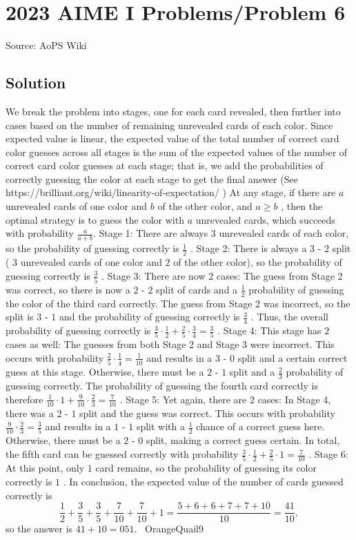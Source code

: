 \documentclass[12pt]{article}
\begin{document}
\section*{{2023 AIME I Problems/Problem 6}}
Source: AoPS Wiki

\subsection*{Solution}
We break the problem into stages, one for each card revealed, then further into cases based on the number of remaining unrevealed cards of each color. Since expected value is linear, the expected value of the total number of correct card color guesses across all stages is the sum of the expected values of the number of correct card color guesses at each stage; that is, we add the probabilities of correctly guessing the color at each stage to get the final answer (See https://brilliant.org/wiki/linearity-of-expectation/ ) At any stage, if there are $a$ unrevealed cards of one color and $b$ of the other color, and $a \geq b$ , then the optimal strategy is to guess the color with $a$ unrevealed cards, which succeeds with probability $\frac{a}{a+b}.$ Stage 1: There are always $3$ unrevealed cards of each color, so the probability of guessing correctly is $\frac{1}{2}$ . Stage 2: There is always a $3$ - $2$ split ( $3$ unrevealed cards of one color and $2$ of the other color), so the probability of guessing correctly is $\frac{3}{5}$ . Stage 3: There are now $2$ cases: The guess from Stage 2 was correct, so there is now a $2$ - $2$ split of cards and a $\frac{1}{2}$ probability of guessing the color of the third card correctly. The guess from Stage 2 was incorrect, so the split is $3$ - $1$ and the probability of guessing correctly is $\frac{3}{4}$ . Thus, the overall probability of guessing correctly is $\frac{3}{5} \cdot \frac{1}{2} + \frac{2}{5} \cdot \frac{3}{4} = \frac{3}{5}$ . Stage 4: This stage has $2$ cases as well: The guesses from both Stage 2 and Stage 3 were incorrect. This occurs with probability $\frac{2}{5} \cdot \frac{1}{4} = \frac{1}{10}$ and results in a $3$ - $0$ split and a certain correct guess at this stage. Otherwise, there must be a $2$ - $1$ split and a $\frac{2}{3}$ probability of guessing correctly. The probability of guessing the fourth card correctly is therefore $\frac{1}{10} \cdot 1 + \frac{9}{10} \cdot \frac{2}{3} = \frac{7}{10}$ . Stage 5: Yet again, there are $2$ cases: In Stage 4, there was a $2$ - $1$ split and the guess was correct. This occurs with probability $\frac{9}{10} \cdot \frac{2}{3} = \frac{3}{5}$ and results in a $1$ - $1$ split with a $\frac{1}{2}$ chance of a correct guess here. Otherwise, there must be a $2$ - $0$ split, making a correct guess certain. In total, the fifth card can be guessed correctly with probability $\frac{3}{5} \cdot \frac{1}{2} + \frac{2}{5} \cdot 1 = \frac{7}{10}$ . Stage 6: At this point, only $1$ card remains, so the probability of guessing its color correctly is $1$ . In conclusion, the expected value of the number of cards guessed correctly is \[\frac{1}{2} + \frac{3}{5} + \frac{3}{5} + \frac{7}{10} + \frac{7}{10} + 1 = \frac{5+6+6+7+7+10}{10} = \frac{41}{10},\] so the answer is $41 + 10 = \boxed{051}.$ ~OrangeQuail9
\end{document}
